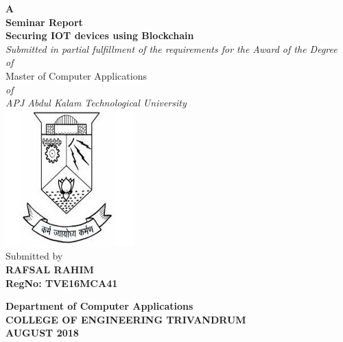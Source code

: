 \begin{titlepage}
\begin{center}
\textbf{ A  }\\
\vspace{0.35cm}
\textbf{ Seminar Report}\\
\vspace{0.55cm}
\textbf{\Large{Securing IOT devices using Blockchain}}\\ \vspace{0.2cm}
\normalsize
\vspace{0.5cm}
\emph{Submitted in partial fulfillment of the requirements for the Award of the Degree}\\
\vspace{0.35cm}
\emph{of}\\
\vspace{0.35cm}
Master of Computer Applications\\
\vspace{0.35cm}
\emph{of}\\
\vspace{0.35cm}
\emph{ {APJ Abdul Kalam Technological University} }\\
\normalsize
\vspace{0.5cm}
\includegraphics[height=0.30\textwidth]{./logo}\\
\vspace{0.3cm}
Submitted by\\
\vspace{0.3cm}
\textbf{RAFSAL RAHIM}\\
\vspace{0.5cm}
\textbf{RegNo: TVE16MCA41 }\\
\vspace{1.8cm}

\normalsize
\textbf{Department of Computer Applications}\\[0.3cm]
\textbf{COLLEGE OF ENGINEERING TRIVANDRUM}\\[0.4cm]
\textbf{AUGUST 2018}\\
\end{center}
\end{titlepage}

